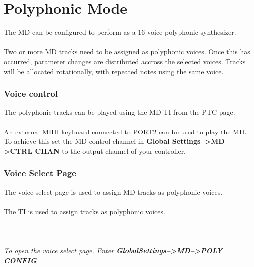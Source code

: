 \chapter{Polyphonic Mode}
The MD can be configured to perform as a 16 voice polyphonic synthesizer.\\
\\
Two or more MD tracks need to be assigned as polyphonic voices. Once this has occurred, parameter changes are distributed accross the selected voices. Tracks will be allocated rotationally, with repeated notes using the same voice. 

\subsection{Voice control}
The polyphonic tracks can be played using the MD TI from the PTC page.\\
\\An external MIDI keyboard connected to PORT2 can be used to play the MD.
To achieve this set the MD control channel in \textbf{Global Settings-->MD-->CTRL CHAN} to the output channel of your controller.

\subsection{Voice Select Page}
The voice select page is used to assign MD tracks as polyphonic voices.\\\\
The TI is used to assign tracks as polyphonic voices.\\\\
\\\\
\textit{To open the voice select page. Enter \textbf{GlobalSettings-->MD-->POLY CONFIG}}
